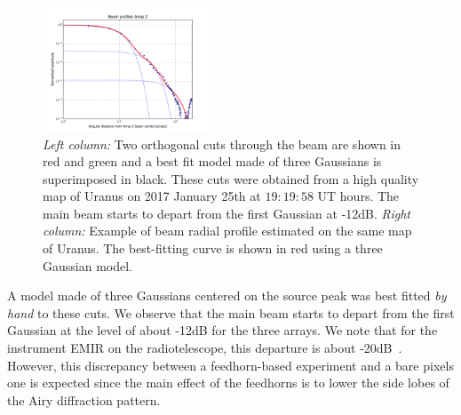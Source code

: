 \begin{figure}[ht!]
\begin{center}
    \includegraphics[clip=true, trim={-0.5cm, -0.65cm, 0, 0}, width=0.44\textwidth]{Figures/Beam_profiles_A2_FR.pdf}
    \caption[Beam structure]{\emph{Left column:} Two orthogonal cuts through the
      beam are shown in red and green and a best fit model made of three
      Gaussians is superimposed in black.
      These cuts were obtained from a high quality map of Uranus on 2017
      January 25th at $19:19:58$ UT hours. The main beam starts to depart from the first Gaussian
      at -12dB. \emph{Right column:} Example of beam radial profile
      estimated on the same map of Uranus. The best-fitting curve is shown
      in red using a three Gaussian model.   
    }
    \label{fig:beam_structure_example}
  \end{center}
\end{figure}

A model made of three Gaussians centered on the source peak was best
fitted {\it by hand} to these cuts.
We observe that the main beam starts to depart from the first
Gaussian at the level of about -12dB for the three arrays.
We note that for the instrument EMIR on the radiotelescope,
this departure is about -20dB~\cite{Kramer2013}. However, this
discrepancy between a feedhorn-based experiment and a bare pixels one
is expected since the main effect of the feedhorns is to lower the
side lobes of the Airy diffraction pattern.



